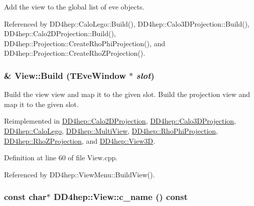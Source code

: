 Add the view to the global list of eve objects. 

Referenced by DD4hep::CaloLego::Build(), DD4hep::Calo3DProjection::Build(), DD4hep::Calo2DProjection::Build(), DD4hep::Projection::CreateRhoPhiProjection(), and DD4hep::Projection::CreateRhoZProjection().\hypertarget{class_d_d4hep_1_1_view_ab4e12874a9cb6a599f268b027443c6ce}{
\subsubsection[{Build}]{ \& View::Build (TEveWindow $\ast$ {\em slot})}}
\label{class_d_d4hep_1_1_view_ab4e12874a9cb6a599f268b027443c6ce}


Build the view view and map it to the given slot. Build the projection view and map it to the given slot. 

Reimplemented in \hyperlink{class_d_d4hep_1_1_calo2_d_projection_a4ac47f2293dd1af3b2dc1b6311edb170}{DD4hep::Calo2DProjection}, \hyperlink{class_d_d4hep_1_1_calo3_d_projection_a2f0865f08b8eedfc84323b8a280d1216}{DD4hep::Calo3DProjection}, \hyperlink{class_d_d4hep_1_1_calo_lego_ab1ef28e69a78dbe27e6a33b1d22cc713}{DD4hep::CaloLego}, \hyperlink{class_d_d4hep_1_1_multi_view_a979d39b6332fa3a647a12d982a4f74fb}{DD4hep::MultiView}, \hyperlink{class_d_d4hep_1_1_rho_phi_projection_a6a8d8e5c6a15d559da719c23eb8d7b8c}{DD4hep::RhoPhiProjection}, \hyperlink{class_d_d4hep_1_1_rho_z_projection_adc2e30a682bc645b5433d055774930ef}{DD4hep::RhoZProjection}, and \hyperlink{class_d_d4hep_1_1_view3_d_a8067ea1bbbbcf503e271acd7dcace79f}{DD4hep::View3D}.

Definition at line 60 of file View.cpp.

Referenced by DD4hep::ViewMenu::BuildView().\hypertarget{class_d_d4hep_1_1_view_a381c6164fc014a19978c325a848d9a5e}{
\subsubsection[{c\_\-name}]{\setlength{\rightskip}{0pt plus 5cm}const char$\ast$ DD4hep::View::c\_\-name () const}}
\label{class_d_d4hep_1_1_view_a381c6164fc014a19978c325a848d9a5e}


